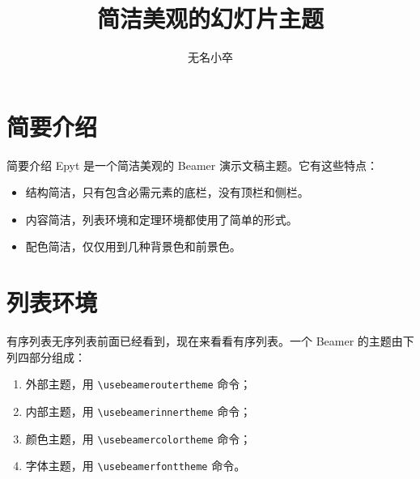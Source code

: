\documentclass[14pt,notheorems]{beamer}
\begin{document}
\title{简洁美观的幻灯片主题}
\author{无名小卒}

\begin{frame}[plain]\transboxout
\titlepage
\end{frame}



\begin{frame}[plain]\transboxout
\titlepage
\end{frame}

\section{简要介绍}

\begin{frame}{简要介绍}\transdissolve
Epyt 是一个简洁美观的 Beamer 演示文稿主题。它有这些特点：\pause
\begin{itemize}[<+->]
\item 结构简洁，只有包含必需元素的底栏，没有顶栏和侧栏。
\item 内容简洁，列表环境和定理环境都使用了简单的形式。
\item 配色简洁，仅仅用到几种背景色和前景色。
\end{itemize}
\end{frame}


\begin{frame}[plain]\transboxout
\titlepage
\end{frame}

\section{列表环境}

\begin{frame}[fragile]{有序列表}\transwipe[direction=270]
无序列表前面已经看到，现在来看看有序列表。一个 Beamer 的主题由下列四部分组成：\pause
\begin{enumerate}[<+->]
\item 外部主题，用 \verb!\usebeameroutertheme! 命令；
\item 内部主题，用 \verb!\usebeamerinnertheme! 命令；
\item 颜色主题，用 \verb!\usebeamercolortheme! 命令；
\item 字体主题，用 \verb!\usebeamerfonttheme! 命令。
\end{enumerate}
\end{frame}
\end{document}
